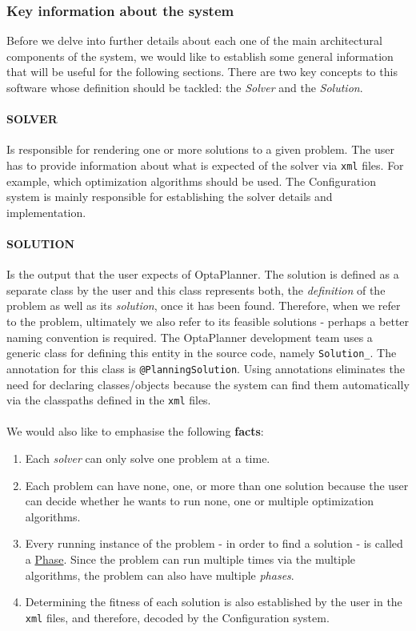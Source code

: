 \subsubsection{Key information about the system}
\label{subsub:keyinfo}
Before we delve into further details about each one of the main architectural components of the system, we would like to establish some general information that will be useful for the following sections. There are two key concepts to this software whose definition should be tackled: the \textit{Solver} and the \textit{Solution}.
\paragraph{{\scriptsize SOLVER}}
\label{para:solver}
Is responsible for rendering one or more solutions to a given problem. The user has to provide information about what is expected of the solver via \verb!xml! files. For example, which optimization algorithms should be used. The Configuration system is mainly responsible for establishing the solver details and implementation.
\paragraph{{\scriptsize SOLUTION}}
Is the output that the user expects of OptaPlanner. The solution is defined as a separate class by the user and this class represents both, the \textit{definition} of the problem as well as its \textit{solution}, once it has been found. Therefore, when we refer to the problem, ultimately we also refer to its feasible solutions - perhaps a better naming convention is required. The OptaPlanner development team uses a generic class for defining this entity in the source code, namely \verb!Solution_!. The annotation for this class is \verb!@PlanningSolution!. Using annotations eliminates the need for declaring classes/objects because the system can find them automatically via the classpaths defined in the \verb!xml! files.\\\\
We would also like to emphasise the following \textbf{facts}:
\begin{enumerate}[label=(\roman*)]
    \item Each \textit{solver} can only solve one problem at a time.
    \item Each problem can have none, one, or more than one solution because the user can decide whether he wants to run none, one or multiple optimization algorithms.
    \item Every running instance of the problem - in order to find a solution - is called a \underline{Phase}. Since the problem can run multiple times via the multiple algorithms, the problem can also have multiple \textit{phases}.
    \item Determining the fitness of each solution is also established by the user in the \verb!xml! files, and therefore, decoded by the Configuration system.
\end{enumerate}
